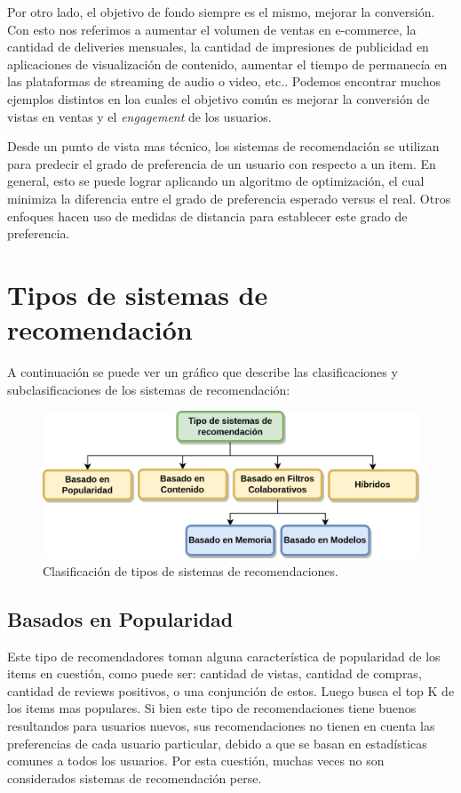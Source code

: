 \documentclass[11pt,a4paper,twoside]{thesis}
\begin{document}
Por otro lado, el objetivo de fondo siempre es el mismo, mejorar la conversión. Con esto nos referimos a aumentar el volumen de ventas en e-commerce, la cantidad de deliveries mensuales, la cantidad de impresiones de publicidad en aplicaciones de visualización de contenido, aumentar el tiempo de permanecía en las plataformas de streaming de audio o video, etc.. Podemos encontrar muchos ejemplos distintos en loa cuales el objetivo común es mejorar la conversión de vistas en ventas y el \textit{engagement} de los usuarios.

Desde un punto de vista mas técnico, los sistemas de recomendación se utilizan para predecir el grado de preferencia de un usuario con respecto a un item. En general, esto se puede lograr aplicando un algoritmo de optimización, el cual minimiza la diferencia entre el grado de preferencia esperado versus el real. Otros enfoques hacen uso de medidas de distancia para establecer este grado de preferencia.

\clearpage
\section{Tipos de sistemas de recomendación}

A continuación se puede ver un gráfico que describe las clasificaciones y subclasificaciones de los sistemas de recomendación:


\begin{figure}[!htb]
	\centering
	\includegraphics[width=12cm]{./images/clasificacion-sis-rec.png}
	\caption{Clasificación de tipos de sistemas de recomendaciones.}
\end{figure}

\subsection{Basados en Popularidad} 

Este tipo de recomendadores toman alguna característica de popularidad de los items en cuestión, como puede ser: cantidad de vistas, cantidad de compras, cantidad de reviews positivos, o una conjunción de estos. Luego busca el top K de los items mas populares. Si bien este tipo de recomendaciones tiene buenos resultandos para usuarios nuevos, sus recomendaciones no tienen en cuenta las preferencias de cada usuario particular, debido a que se basan en estadísticas comunes a todos los usuarios. Por esta cuestión, muchas veces no son considerados sistemas de recomendación perse.
\end{document}
